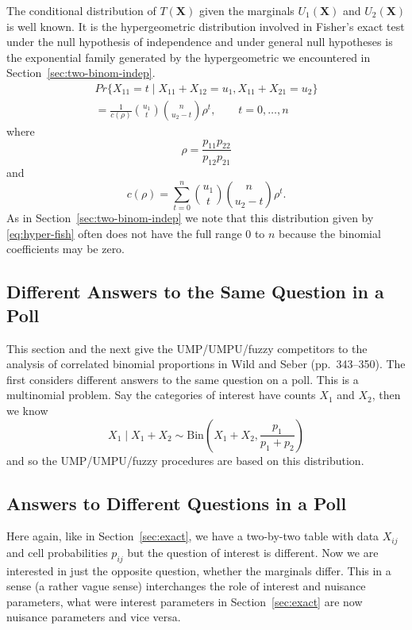\documentclass{article}
\newcommand{\BinomialDis}{\text{Bin}}
\begin{document}
The conditional distribution of $T(\mathbf{X})$ given the marginals
$U_1(\mathbf{X})$ and $U_2(\mathbf{X})$ is well known.  It is the
hypergeometric distribution involved in Fisher's exact test under the
null hypothesis of independence and under general null hypotheses is
the exponential family generated by the hypergeometric we encountered
in Section~\ref{sec:two-binom-indep}.
\begin{multline} \label{eq:hyper-fish}
   Pr\{X_{1 1} = t \mid X_{1 1} + X_{1 2} = u_1, X_{1 1} + X_{2 1} = u_2\}
   \\
   =
   \frac{1}{c(\rho)} \binom{u_1}{t} \binom{n}{u_2 - t} \rho^t,
   \qquad t = 0, \ldots, n
\end{multline}
where
$$
   \rho = \frac{p_{1 1} p_{2 2}}{p_{1 2} p_{2 1}}
$$
and
$$
   c(\rho) = \sum_{t = 0}^n \binom{u_1}{t} \binom{n}{u_2 - t} \rho^t.
$$
As in Section~\ref{sec:two-binom-indep} we note that this distribution
given by \eqref{eq:hyper-fish} often does not have the full range 0 to $n$
because the binomial coefficients may be zero.

\subsection{Different Answers to the Same Question in a Poll}

This section and the next give the UMP/UMPU/fuzzy competitors to the
analysis of correlated binomial proportions in Wild and Seber
(pp.~343--350).  The first considers different answers to the same
question on a poll.  This is a multinomial problem.  Say the categories
of interest have counts $X_1$ and $X_2$, then we know
$$
   X_1 \mid X_1 + X_2
   \sim
   \BinomialDis\left(X_1 + X_2, \frac{p_1}{p_1 + p_2}\right)
$$
and so the UMP/UMPU/fuzzy procedures are based on this distribution.

\subsection{Answers to Different Questions in a Poll}

Here again, like in Section~\ref{sec:exact}, we have a two-by-two table
with data $X_{i j}$ and cell probabilities $p_{i j}$ but the question of
interest is different.  Now we are interested in just the opposite question,
whether the marginals differ.  This in a sense (a rather vague sense)
interchanges the role of interest and nuisance parameters, what were interest
parameters in Section~\ref{sec:exact} are now nuisance parameters and vice
versa.
\end{document}
